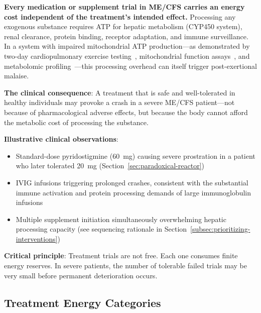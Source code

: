 \begin{warning}
\label{warn:treatment-energy-gamble}
\textbf{Every medication or supplement trial in ME/CFS carries an energy cost independent of the treatment's intended effect.} Processing any exogenous substance requires ATP for hepatic metabolism (CYP450 system), renal clearance, protein binding, receptor adaptation, and immune surveillance. In a system with impaired mitochondrial ATP production---as demonstrated by two-day cardiopulmonary exercise testing~\cite{keller2024cpet,VanCampen2020SeverityCPET}, mitochondrial function assays~\cite{Myhill2009mitochondrial}, and metabolomic profiling~\cite{Naviaux2017suramin,Fluge2016}---this processing overhead can itself trigger post-exertional malaise.

\textbf{The clinical consequence}: A treatment that is safe and well-tolerated in healthy individuals may provoke a crash in a severe ME/CFS patient---not because of pharmacological adverse effects, but because the body cannot afford the metabolic cost of processing the substance.

\textbf{Illustrative clinical observations}:
\begin{itemize}
    \item Standard-dose pyridostigmine (60~mg) causing severe prostration in a patient who later tolerated 20~mg (Section~\ref{sec:paradoxical-reactor})
    \item IVIG infusions triggering prolonged crashes, consistent with the substantial immune activation and protein processing demands of large immunoglobulin infusions
    \item Multiple supplement initiation simultaneously overwhelming hepatic processing capacity (see sequencing rationale in Section~\ref{subsec:prioritizing-interventions})
\end{itemize}

\textbf{Critical principle}: Treatment trials are not free. Each one consumes finite energy reserves. In severe patients, the number of tolerable failed trials may be very small before permanent deterioration occurs.
\end{warning}

\subsection{Treatment Energy Categories}
\label{subsec:energy-categories}


